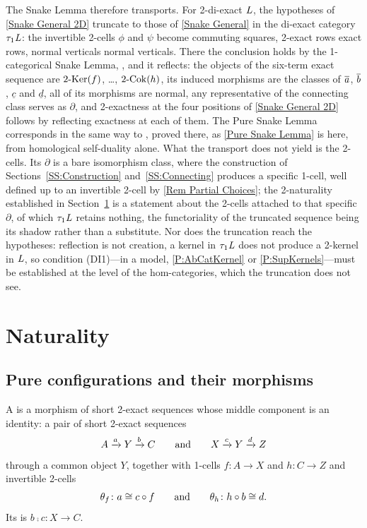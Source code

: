 \begin{remark}
	The Snake Lemma therefore transports. For 2-di-exact \(\mathit{L}\), the hypotheses of \thex\ref{Snake General 2D} truncate to those of \corx\ref{Snake General} in the di-exact category \(\tau_{1}\mathit{L}\): the invertible 2-cells \(\phi\) and \(\psi\) become commuting squares, 2-exact rows exact rows, normal verticals normal verticals. There the conclusion holds by the 1-categorical Snake Lemma, \cite[Theorem~2.2.2 and Corollary~2.2.4]{PVdL3}, and it reflects: the objects of the six-term exact sequence are \(2\text{-}\mathrm{Ker}(f)\), \dots, \(2\text{-}\mathrm{Cok}(h)\), its induced morphisms are the classes of \(\overline{a}\), \(\overline{b}\), \(\underline{c}\) and \(\underline{d}\), all of its morphisms are normal, any representative of the connecting class serves as \(\partial\), and 2-exactness at the four positions of \thex\ref{Snake General 2D} follows by reflecting exactness at each of them. The Pure Snake Lemma corresponds in the same way to \cite[Lemma~2.2.1]{PVdL3}, proved there, as \lemx\ref{Pure Snake Lemma} is here, from homological self-duality alone. What the transport does not yield is the 2-cells. Its \(\partial\) is a bare isomorphism class, where the construction of Sections~\ref{SS:Construction} and~\ref{SS:Connecting} produces a specific 1-cell, well defined up to an invertible 2-cell by \remx\ref{Rem Partial Choices}; the 2-naturality established in Section~\ref{S:Naturality} is a statement about the 2-cells attached to that specific \(\partial\), of which \(\tau_{1}\mathit{L}\) retains nothing, the functoriality of the truncated sequence being its shadow rather than a substitute. Nor does the truncation reach the hypotheses: reflection is not creation, a kernel in \(\tau_{1}\mathit{L}\) does not produce a 2-kernel in \(\mathit{L}\), so condition \textup{(DI1)}---in a model, \prox\ref{P:AbCatKernel} or \prox\ref{P:SupKernels}---must be established at the level of the hom-categories, which the truncation does not see.
\end{remark}

\section{Naturality}\label{S:Naturality}

\subsection{Pure configurations and their morphisms}\label{SS:PureConfigurations}

\begin{definition}
  \label{Def:PureConfiguration} 
  A  is a morphism of short 2-exact sequences whose middle component is an identity: a pair of short 2-exact sequences
	\[
		A\xrightarrow[]{a}Y\xrightarrow[]{b}C
		\qquad\text{and}\qquad
		X\xrightarrow[]{c}Y\xrightarrow[]{d}Z
	\]
	through a common object \(Y\), together with 1-cells \(f\colon A\to X\) and \(h\colon C\to Z\) and invertible 2-cells
	\[
		\theta_f\colon a\cong c\circ f
		\qquad\text{and}\qquad
		\theta_h\colon h\circ b\cong d\text{.}
	\]
	Its  is \(b\comp c\colon X\to C\).
\end{definition}


